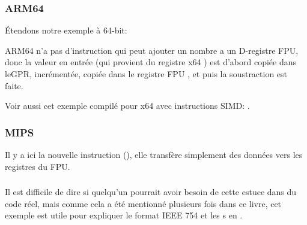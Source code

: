 \subsubsection{ARM64}

Étendons notre exemple à 64-bit:



ARM64 n'a pas d'instruction qui peut ajouter un nombre a un D-registre FPU, donc
la valeur en entrée (qui provient du registre x64 ) est d'abord copiée dans
le\ac{GPR}, incrémentée, copiée dans le registre FPU , et puis la soustraction
est faite.



Voir aussi cet exemple compilé pour x64 avec instructions SIMD: .

\subsubsection{MIPS}


Il y a ici la nouvelle instruction  (), elle transfère
simplement des données vers les registres du FPU.



\subsubsection{\Conclusion}

Il est difficile de dire si quelqu'un pourrait avoir besoin de cette estuce dans
du code réel, mais comme cela a été mentionné plusieurs fois dans ce livre, cet exemple
est utile pour expliquer le format IEEE 754 et les s en \CCpp.
